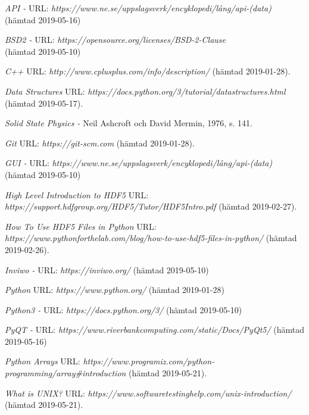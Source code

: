 \begin{thebibliography}{99}

 \textit{API -} URL: \textit{https://www.ne.se/uppslagsverk/encyklopedi/lång/api-(data)} \\ (hämtad 2019-05-16)

 \textit{BSD2 -} URL: \textit{https://opensource.org/licenses/BSD-2-Clause} \\
(hämtad 2019-05-10)

 \textit{C++} URL: \textit{http://www.cplusplus.com/info/description/} (hämtad 2019-01-28).

 \textit{Data Structures} URL: \textit{https://docs.python.org/3/tutorial/datastructures.html} (hämtad 2019-05-17).

 \textit{Solid State Physics -} Neil Ashcroft och David Mermin, 1976, s. 141.

 \textit{Git} URL: \textit{https://git-scm.com} (hämtad 2019-01-28).

 \textit{GUI -} URL: \textit{https://www.ne.se/uppslagsverk/encyklopedi/lång/api-(data)}
\\(hämtad 2019-05-10)

 \textit{High Level Introduction to HDF5} URL: \textit{https://support.hdfgroup.org/HDF5/Tutor/HDF5Intro.pdf} (hämtad 2019-02-27).

 \textit{How To Use HDF5 Files in Python} URL: \textit{https://www.pythonforthelab.com/blog/how-to-use-hdf5-files-in-python/} (hämtad 2019-02-26).

 \textit{Inviwo -} URL: \textit{https://inviwo.org/} (hämtad 2019-05-10)

 \textit{Python} URL: \textit{https://www.python.org/} (hämtad 2019-01-28)

 \textit{Python3 -} URL: \textit{https://docs.python.org/3/} (hämtad 2019-05-10)

 \textit{PyQT -} URL:
\textit{https://www.riverbankcomputing.com/static/Docs/PyQt5/} (hämtad 2019-05-16)

 \textit{Python Arrays} URL: \textit{https://www.programiz.com/python-programming/array\#introduction} (hämtad 2019-05-21).

 \textit{What is UNIX?} URL: \textit{https://www.softwaretestinghelp.com/unix-introduction/} (hämtad 2019-05-21).


\end{thebibliography}
